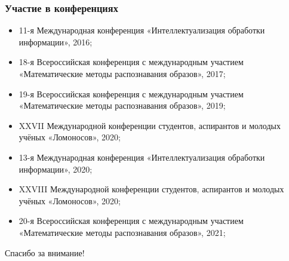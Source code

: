 \begin{frame}
    \frametitle{Участие в конференциях}
    \begin{itemize}
        \item 11-я Международная конференция «Интеллектуализация обработки информации», 2016;
        \item 18-я Всероссийская конференция с международным участием «Математические методы распознавания образов», 2017;
        \item 19-я Всероссийская конференция с международным участием «Математические методы распознавания образов», 2019;
        \item XXVII Международной конференции студентов, аспирантов и молодых учёных «Ломоносов», 2020;
        \item 13-я Международная конференция «Интеллектуализация обработки информации», 2020;
        \item XXVIII Международной конференции студентов, аспирантов и молодых учёных «Ломоносов», 2020;
        \item 20-я Всероссийская конференция с международным участием «Математические методы распознавания образов», 2021;
    \end{itemize}
\end{frame}

\begin{frame} %
    \begin{center}
        \Huge
        Спасибо за внимание!
    \end{center}
\end{frame}
